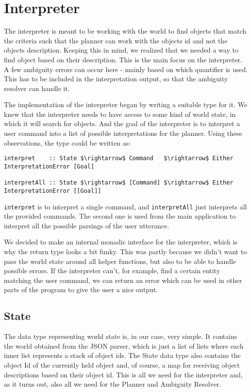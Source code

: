 \section*{Interpreter}


The interpreter is meant to be working with the world to find objects that match the criteria such that the planner can work with the objects id and not the objects description.
Keeping this in mind, we realized that we needed a way to find object based on their description.
This is the main focus on the interpreter.
A few ambiguity errors can occur here - mainly based on which quantifier is used.
This has to be included in the interpretation output, so that the ambiguity resolver can handle it.

The implementation of the interpreter began by writing a suitable type for it.
We knew that the interpreter needs to have access to some kind of world state, in which it will search for objects.
And the goal of the interpreter is to interpret a user command into a list of possible interpretations for the planner.
Using these observations, the type could be written as:

\begin{lstlisting}
interpret    :: State $\rightarrow$ Command   $\rightarrow$ Either InterpretationError [Goal]

interpretAll :: State $\rightarrow$ [Command] $\rightarrow$ Either InterpretationError [[Goal]]
\end{lstlisting}

\verb|interpret| is to interpret a single command, and \verb|interpretAll| just interprets all the provided commands. The second one is used from the main application to interpret all the possible parsings of the user utterance.

We decided to make an internal monadic interface for the interpreter, which is why the return type looks a bit funky.
This was partly because we didn't want to pass the world state around all helper functions, but also to be able to handle possible errors.
If the interpreter can't, for example, find a certain entity matching the user command, we can return an error which can be used in other parts of the program to give the user a nice output.

\subsection*{State}
The data type representing world state is, in our case, very simple.
It contains the world obtained from the JSON parser, which is just a list of lists where each inner list represents a stack of object ids.
The State data type also contains the object Id of the currently held object and, of course, a map for receiving object descriptions based on their object id.
This is all we need for the interpreter and, as it turns out, also all we need for the Planner and Ambiguity Resolver.

